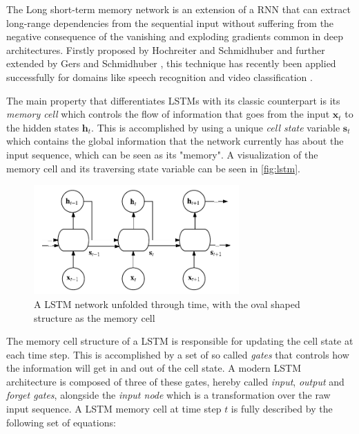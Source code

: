 \documentclass{kththesis}
\begin{document}
The Long short-term memory network is an extension of a RNN that can extract long-range dependencies from the sequential input without suffering from the negative consequence of the vanishing and exploding gradients common in deep architectures. Firstly proposed by Hochreiter and Schmidhuber \citep{hochreiter1997long} and further extended by Gers and Schmidhuber \citep{gers1999learning}, this technique has recently been applied successfully for domains like speech recognition \citep{graves2013speech} and video classification \citep{yue2015beyond}.

The main property that differentiates LSTMs with its classic counterpart is its \emph{memory cell} which controls the flow of information that goes from the input $\mathbf{x}_t$ to the hidden states $\mathbf{h}_t$. This is accomplished by using a unique \emph{cell state} variable $\mathbf{s}_t$ which contains the global information that the network currently has about the input sequence, which can be seen as its "memory". A visualization of the memory cell and its traversing state variable can be seen in \autoref{fig:lstm}.

\begin{figure}[h]
    \centering
    \includegraphics[width=0.7\textwidth,keepaspectratio]{figures/lstm.pdf}
    \caption{A LSTM network unfolded through time, with the oval shaped structure as the memory cell}
    \label{fig:lstm}
\end{figure}

The memory cell structure of a LSTM is responsible for updating the cell state at each time step. This is accomplished by a set of so called \emph{gates} that controls how the information will get in and out of the cell state. A modern LSTM architecture is composed of three of these gates, hereby called \emph{input}, \emph{output} and \emph{forget gates}, alongside the \emph{input node} which is a transformation over the raw input sequence. A LSTM memory cell at time step $t$ is fully described by the following set of equations:
\end{document}
